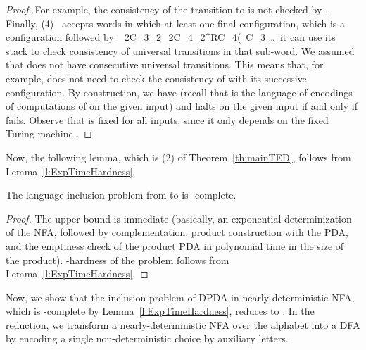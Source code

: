 \documentclass{CSML}
\begin{document}
\begin{proof}
For example, the consistency of the transition  to   is not checked by .
Finally, (4)~ accepts words in which at least one final configuration, which is a configuration followed by \UATMC_2C_3\UATM\delta_2\Ar\ApC_2C_{4}\ApC_2^RC_{4}\left(\, C_{3} \ldots \, it can use its stack to check consistency of universal transitions in that sub-word.
We assumed that  does not have consecutive universal transitions. This means that, for example,  does not need to check 
the consistency of  with its successive configuration.
By construction, we have  (recall that  is the language of encodings of computations of  on the given input) and 
 halts on the given input if and only if  fails.
Observe that  is fixed for all inputs, since it only depends on the fixed Turing machine .\end{proof}


Now, the following lemma, which is (2) of Theorem~\ref{th:mainTED}, 
follows from Lemma~\ref{l:ExpTimeHardness}.

\begin{lem}
The language inclusion problem from  to  is -complete.
\label{th:inlusionExpTimeHard}
\end{lem}
\begin{proof}
\newcommand{\Ap}{\mathcal{A}_p}
\newcommand{\Ar}{\mathcal{A}_r}
\newcommand{\Ad}{\mathcal{A}_d}
The  upper bound is immediate (basically, an exponential 
determinization of the NFA, followed by complementation, 
product construction with the PDA, and the emptiness check of the product 
PDA in polynomial time in the size of the product).
-hardness of the problem follows from Lemma~\ref{l:ExpTimeHardness}.
\end{proof}

Now, we show that the inclusion problem of DPDA in nearly-deterministic NFA,
which is -complete by Lemma~\ref{l:ExpTimeHardness},
reduces to . In the reduction, we transform a nearly-deterministic NFA  over the alphabet 
into a DFA  by encoding a single non-deterministic choice by auxiliary letters. 
\end{document}
